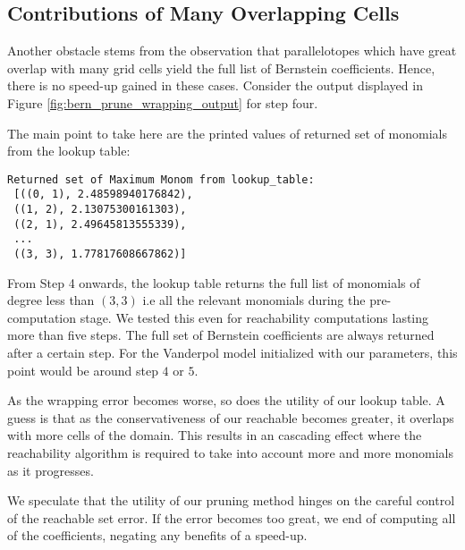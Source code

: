 \subsection{Contributions of Many Overlapping Cells}
Another obstacle stems from the observation that parallelotopes which have great overlap with many grid cells yield the full list of Bernstein coefficients. Hence, there is no speed-up gained in these cases. Consider the output displayed in Figure \ref{fig:bern_prune_wrapping_output} for step four.

The main point to take here are the printed values of returned set of monomials from the lookup table:
%
\begin{verbatim}
Returned set of Maximum Monom from lookup_table:
 [((0, 1), 2.48598940176842),
 ((1, 2), 2.13075300161303),
 ((2, 1), 2.49645813555339),
 ...
 ((3, 3), 1.77817608667862)]
\end{verbatim}
%
From Step 4 onwards, the lookup table returns the full list of monomials of degree less than $(3,3)$ i.e all the relevant monomials during the pre-computation stage.
%
We tested this even for reachability computations lasting more than five steps. The full set of Bernstein coefficients are always returned after a certain step. For the Vanderpol model initialized with our parameters, this point would be around step $4$ or $5$.

As the wrapping error becomes worse, so does the utility of our lookup table. A guess is that as the conservativeness of our reachable becomes greater, it overlaps with more cells of the domain. This results in an cascading effect where the reachability algorithm is required to take into account more and more monomials as it progresses.

We speculate that the utility of our pruning method hinges on the careful control of the reachable set error. If the error becomes too great, we end of computing all of the coefficients, negating any benefits of a speed-up.
